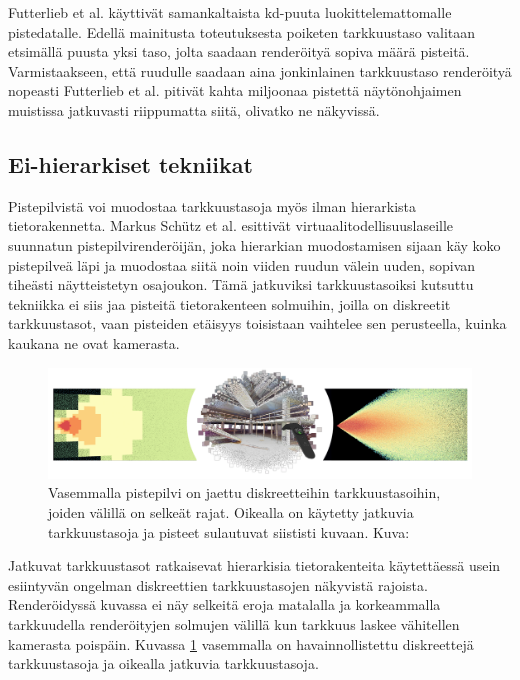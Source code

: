 Futterlieb et al. käyttivät samankaltaista kd-puuta luokittelemattomalle pistedatalle. Edellä mainitusta toteutuksesta poiketen tarkkuustaso valitaan etsimällä puusta yksi taso, jolta saadaan renderöityä sopiva määrä pisteitä. Varmistaakseen, että ruudulle saadaan aina jonkinlainen tarkkuustaso renderöityä nopeasti Futterlieb et al. pitivät kahta miljoonaa pistettä näytönohjaimen muistissa jatkuvasti riippumatta siitä, olivatko ne näkyvissä. \cite{smooth}

\subsection{Ei-hierarkiset tekniikat}

Pistepilvistä voi muodostaa tarkkuustasoja myös ilman hierarkista tietorakennetta. Markus Schütz et al. esittivät virtuaalitodellisuuslaseille suunnatun pistepilvirenderöijän, joka hierarkian muodostamisen sijaan käy koko pistepilveä läpi ja muodostaa siitä noin viiden ruudun välein uuden, sopivan tiheästi näytteistetyn osajoukon. Tämä jatkuviksi tarkkuustasoiksi  kutsuttu tekniikka ei siis jaa pisteitä tietorakenteen solmuihin, joilla on diskreetit tarkkuustasot, vaan pisteiden etäisyys toisistaan vaihtelee sen perusteella, kuinka kaukana ne ovat kamerasta. \cite{clod}

\begin{figure}
    \centering
    \includegraphics[width=\textwidth]{img/clod.png}
    \caption{Vasemmalla pistepilvi on jaettu diskreetteihin tarkkuustasoihin, joiden välillä on selkeät rajat. Oikealla on käytetty jatkuvia tarkkuustasoja ja pisteet sulautuvat siististi kuvaan. Kuva: \cite{clod}}
    \label{img:clod}
\end{figure}

Jatkuvat tarkkuustasot ratkaisevat hierarkisia tietorakenteita käytettäessä usein esiintyvän ongelman diskreettien tarkkuustasojen näkyvistä rajoista. Renderöidyssä kuvassa ei näy selkeitä eroja matalalla ja korkeammalla tarkkuudella renderöityjen solmujen välillä kun tarkkuus laskee vähitellen kamerasta poispäin. Kuvassa \ref{img:clod} vasemmalla on havainnollistettu diskreettejä tarkkuustasoja ja oikealla jatkuvia tarkkuustasoja.